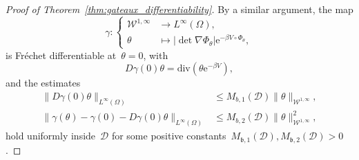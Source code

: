 \documentclass[a4]{article}
\newcommand{\e}{\mathrm{e}}
\renewcommand{\div}{\mathrm{div}}
\newcommand{\fb}{\mathfrak{b}}
\newcommand{\1}{\mathbbm 1}
\newcommand{\Winf}{{{\cW}^{1,\infty}}}
\newcommand{\cW}{\mathcal{W}}
\begin{document}
\begin{proof}[Proof of Theorem~\ref{thm:gateaux_differentiability}]
    By a similar argument, the map
    \begin{equation}
        \label{eq:jacob_expr}
        \gamma:\left\{\begin{aligned}
            \Winf&\rightarrow L^\infty(\Omega),\\
            \theta & \mapsto |\det \nabla \Phi_\theta| \e^{-\beta V\circ \Phi_\theta},
        \end{aligned}\right.
    \end{equation}
    is Fréchet differentiable at~$\theta = 0$, with
    \begin{equation}
        D\gamma(0)\theta = \div\left(\theta\e^{-\beta V}\right),
    \end{equation}
    and the estimates
    \begin{equation}
        \label{eq:dgamma_estimates}
        \begin{aligned}
            \|D\gamma(0)\theta\|_{L^\infty(\Omega)} &\leq M_{b,1}(\mathcal D)\|\theta\|_{\Winf},\\
            \|\gamma(\theta)- \gamma(0)-D\gamma(0)\theta\|_{L^\infty(\Omega)} & \leq M_{b,2}(\mathcal D)\|\theta\|_{\Winf}^2,
        \end{aligned}
    \end{equation}
    hold uniformly inside~$\mathcal D$ for some positive constants~$M_{\fb,1}(\mathcal D),M_{\fb,2}(\mathcal D)>0$.


\end{proof}
\end{document}
